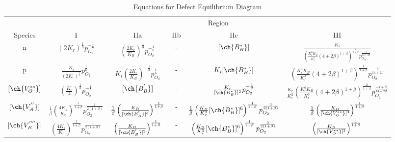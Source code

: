     \begin{table}
    \centering
    \caption{Equations for Defect Equilibrium Diagram}
    \label{tab:defectequ}
    \begin{adjustbox}{width=1.2\textwidth,center=\textwidth}

    \begin{tabular}{c|c|c|c|c|c}
    \multicolumn{1}{l}{} & \multicolumn{5}{c}{Region}\\
    Species & I          & IIa                 & IIb & IIc          & III                  \\
    \hline
    n  & $(2K_r)^{\frac{1}{3}}p_{O_2}^{-\frac{1}{6}}$ & $\left(\frac{2K_r}{K_B}\right)^{\frac{1}{3}}p_{O_2}^{-\frac{1}{6}}$  & - & $\lbrack\ch{B_B^{*}}\rbrack$  & $\frac{K_i}{\left(\frac{K_i^6K_B}{K_r^3}(4+2\beta)^{1+\beta}\right)^{\frac{1}{7+\beta}}p_{O_2}^{\frac{3}{14+2\beta}}}$  \\

    p  & $\frac{K_i}{(2K_r)^{\frac{1}{3}}}p_{O_2}^{\frac{1}{6}}$ & $K_i\left(\frac{2K_r}{K_B}\right)^{-\frac{1}{3}}p_{O_2}^{\frac{1}{6}}$ & - & $K_i\lbrack\ch{B_B^{*}}\rbrack$  & $\left(\frac{K_i^6K_B}{K_r^3}\left(4+2\beta\right)^{1+\beta}\right)^{\frac{1}{7+\beta}}p_{O_2}^{\frac{3}{14+2\beta}}$  \\

    $\lbrack\ch{V_O^{**}}\rbrack$   & $\left(\frac{K_r}{4}\right)^{\frac{1}{3}}p_{O_2}^{-\frac{1}{6}}$ & $\lbrack\ch{B_B^{'}}\rbrack$ & -  & $\frac{K_r}{\lbrack\ch{B_B^{*}}\rbrack^2}p_{O_2}^{-\frac{1}{2}}$ & $\frac{K_r}{K_i^2}\left(\frac{K_i^6K_B}{K_r^3}(4+2\beta)^{1+\beta}\right)^{\frac{2}{7+\beta}}p_{O_2}^{\frac{-1+\beta}{14+2\beta}}$  \\

    $\lbrack\ch{V_A^{''}}\rbrack$   & $\frac{1}{\beta}\left(\frac{4K_s}{K_r}\right)^{\frac{1}{1+\beta}}p_{O_2}^{\frac{1}{2(1+\beta)}}$ & $\frac{1}{\beta}\left(\frac{K_B}{\lbrack\ch{B_B^{'}}\rbrack^3}\right)^{\frac{1}{1+\beta}}$ & -  & $\frac{1}{\beta}\left(\frac{K_B}{K_r^3}\lbrack\ch{B_B^{*}}\rbrack^6\right)^\frac{1}{1+\beta}p_{O_2}^{\frac{3}{2(1+\beta)}}$  & $\frac{1}{\beta}\left(\frac{K_B}{\lbrack\ch{V_O^{**}}\rbrack^3}\right)^{\frac{1}{1+\beta}}$  \\

    $\lbrack\ch{V_B^{''''}}\rbrack$ & $\left(\frac{4K_s}{K_r}\right)^{\frac{1}{1+\beta}}p_{O_2}^{\frac{1}{2(1+\beta)}}$ & $\left(\frac{K_B}{\lbrack\ch{B_B^{'}}\rbrack^3}\right)^{\frac{1}{1+\beta}}$ & -  & $\left(\frac{K_B}{K_r^3}\lbrack\ch{B_B^{*}}\rbrack^6\right)^{\frac{1}{1+\beta}}p_{O_2}^{\frac{3}{2(1+\beta)}}$  & $\left(\frac{K_B}{\lbrack\ch{V_O^{**}}\rbrack^3}\right)^{\frac{1}{1+\beta}}$
    \end{tabular}
    \end{adjustbox}
    \end{table}

